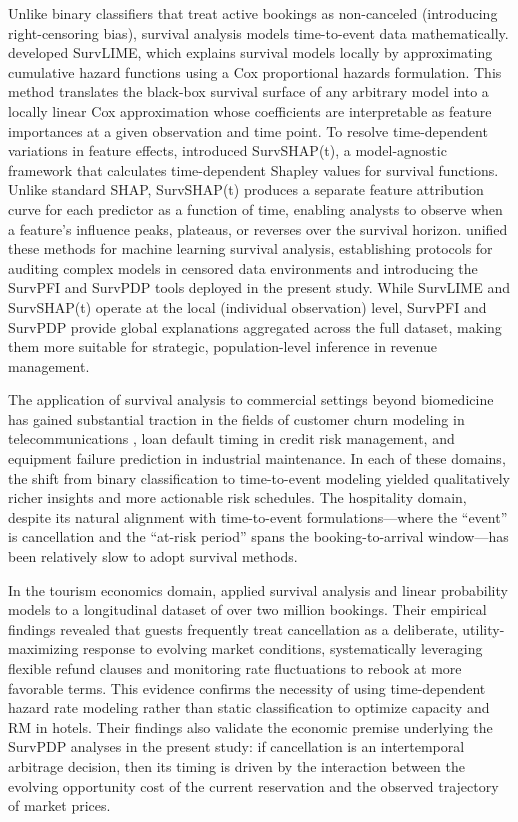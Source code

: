 \documentclass[pdflatex,sn-mathphys-ay]{sn-jnl}
\theoremstyle{thmstyleone}%
\theoremstyle{thmstyletwo}%
\theoremstyle{thmstylethree}%
\begin{document}
Unlike binary classifiers that treat active bookings as non-canceled (introducing right-censoring bias), survival analysis models time-to-event data mathematically. \cite{kovalev2020survlime} developed SurvLIME, which explains survival models locally by approximating cumulative hazard functions using a Cox proportional hazards formulation. This method translates the black-box survival surface of any arbitrary model into a locally linear Cox approximation whose coefficients are interpretable as feature importances at a given observation and time point. To resolve time-dependent variations in feature effects, \cite{krzyzinski2023survshapt} introduced SurvSHAP(t), a model-agnostic framework that calculates time-dependent Shapley values for survival functions. Unlike standard SHAP, SurvSHAP(t) produces a separate feature attribution curve for each predictor as a function of time, enabling analysts to observe when a feature's influence peaks, plateaus, or reverses over the survival horizon. \cite{langbein2025interpretable} unified these methods for machine learning survival analysis, establishing protocols for auditing complex models in censored data environments and introducing the SurvPFI and SurvPDP tools deployed in the present study. While SurvLIME and SurvSHAP(t) operate at the local (individual observation) level, SurvPFI and SurvPDP provide global explanations aggregated across the full dataset, making them more suitable for strategic, population-level inference in revenue management.

The application of survival analysis to commercial settings beyond biomedicine has gained substantial traction in the fields of customer churn modeling in telecommunications \citep{kleinbaum2012survival}, loan default timing in credit risk management, and equipment failure prediction in industrial maintenance. In each of these domains, the shift from binary classification to time-to-event modeling yielded qualitatively richer insights and more actionable risk schedules. The hospitality domain, despite its natural alignment with time-to-event formulations—where the ``event'' is cancellation and the ``at-risk period'' spans the booking-to-arrival window—has been relatively slow to adopt survival methods.

In the tourism economics domain, \cite{mir2026decoding} applied survival analysis and linear probability models to a longitudinal dataset of over two million bookings. Their empirical findings revealed that guests frequently treat cancellation as a deliberate, utility-maximizing response to evolving market conditions, systematically leveraging flexible refund clauses and monitoring rate fluctuations to rebook at more favorable terms. This evidence confirms the necessity of using time-dependent hazard rate modeling rather than static classification to optimize capacity and RM in hotels. Their findings also validate the economic premise underlying the SurvPDP analyses in the present study: if cancellation is an intertemporal arbitrage decision, then its timing is driven by the interaction between the evolving opportunity cost of the current reservation and the observed trajectory of market prices.
\end{document}
